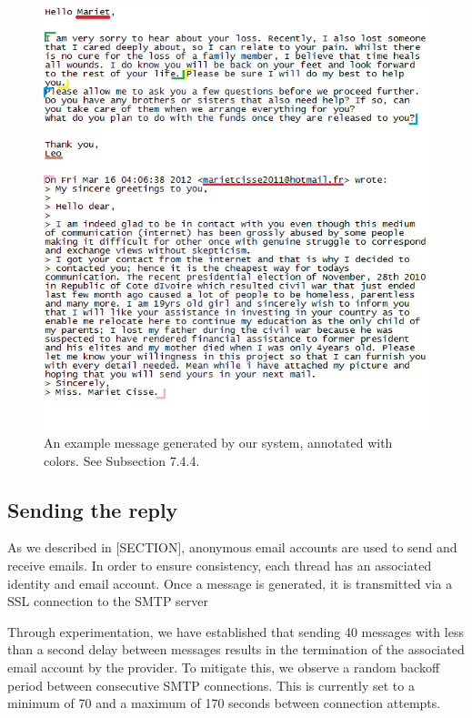 \begin{figure}[h]
	\includegraphics{letter.png}
	\caption{An example message generated by our system, annotated with colors. See Subsection 7.4.4. }
\end{figure}

\subsection{Sending the reply}
As we described in [SECTION], anonymous email accounts are used to send and receive emails. In order to ensure consistency, each thread has an associated identity and email account. Once a message is generated, it is transmitted via a SSL connection to the SMTP server

Through experimentation, we have established that sending 40 messages with less than a second delay between messages results in the termination of the associated email account by the provider. To mitigate this, we observe a random backoff period between consecutive SMTP connections. This is currently set to a minimum of 70 and a maximum of 170 seconds between connection attempts.
